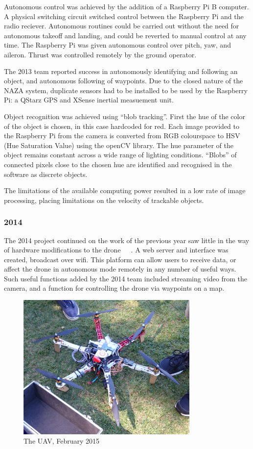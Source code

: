\documentclass[a4paper, 12pt, titlepage]{article}
\begin{document}
Autonomous control was achieved by the addition of a Raspberry Pi B computer. A physical switching circuit switched control between the Raspberry Pi and the radio reciever. Autonomous routines could be carried out without the need for autonomous takeoff and landing, and could be reverted to manual control at any time. The Raspberry Pi was given autonomous control over pitch, yaw, and aileron. Thrust was controlled remotely by the ground operator. 

The 2013 team reported success in autonomously identifying and following an object, and autonomous following of waypoints. Due to the closed nature of the NAZA system, duplicate sensors had to be installed to be used by the Raspberry Pi: a QStarz GPS and XSense inertial measuement unit.

 Object recognition was achieved using “blob tracking”. First the hue of the color of the object is chosen, in this case hardcoded for red. Each image provided to the Raspberry Pi from the camera is converted from RGB colourspace to HSV (Hue Saturation Value) using the openCV library. The hue parameter of the object remains constant across a wide range of lighting conditions. “Blobs” of connected pixels close to the chosen hue are identified and recognised in the software as discrete objects.

The limitations of the available computing power resulted in a low rate of image processing, placing limitations on the velocity of trackable objects.

		\subsubsection{2014}
The 2014 project continued on the work of the previous year saw little in the way of hardware modifications to the drone~\cite{Baxter}~\cite{Mazur}~\cite{Targhagh}. A web server and interface was created, broadcast over wifi. This platform can allow users to receive data, or affect the drone in autonomous mode remotely in any number of useful ways. Such useful functions added by the 2014 team included streaming video from the camera, and a function for controlling the drone via waypoints on a map.

\begin{figure}[h!]
\includegraphics[width=0.8\textwidth]{handoverUAV.png}
\centering
\caption{The UAV, February 2015}
\end{figure}
\end{document}
